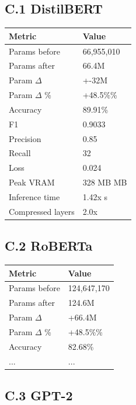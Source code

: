 \subsection{C.1 DistilBERT}

\begin{table}[H]
\centering
\small
\begin{tabular}{ll}
\toprule
\textbf{Metric} & \textbf{Value} \\
\midrule
Params before & 66,955,010 \\
Params after & 66.4M \\
Param $\Delta$ & +-32M \\
Param $\Delta$ \% & +48.5\%\% \\
Accuracy & 89.91\% \\
F1 & 0.9033 \\
Precision & 0.85 \\
Recall & 32 \\
Loss & 0.024 \\
Peak VRAM & 328 MB MB \\
Inference time & 1.42x s \\
Compressed layers & 2.0x \\
\bottomrule
\end{tabular}
\end{table}

\subsection{C.2 RoBERTa}

\begin{table}[H]
\centering
\small
\begin{tabular}{ll}
\toprule
\textbf{Metric} & \textbf{Value} \\
\midrule
Params before & 124,647,170 \\
Params after & 124.6M \\
Param $\Delta$ & +66.4M \\
Param $\Delta$ \% & +48.5\%\% \\
Accuracy & 82.68\% \\
... & ... \\
\bottomrule
\end{tabular}
\end{table}

\subsection{C.3 GPT-2}

